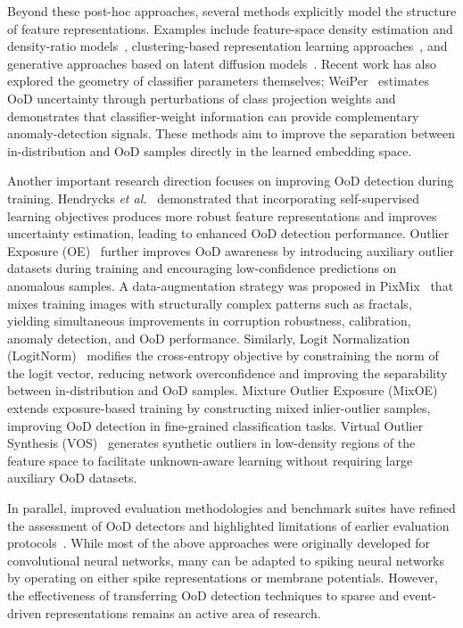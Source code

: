 \documentclass{ieeeaccess}
\begin{document}
Beyond these post-hoc approaches, several methods explicitly model the structure of feature representations. Examples include feature-space density estimation and density-ratio models~\cite{sun2022knn, zhang2022ood}, clustering-based repre\-sen\-tation learning approaches~\cite{sinhamahapatra2022all}, and generative approaches based on latent diffusion models~\cite{10.1145/3731715.3733326}. Recent work has also explored the geometry of classifier parameters themselves; WeiPer~\cite{granz2024weiper} estimates OoD uncertainty through perturbations of class projection weights and demonstrates that classifier-weight information can provide complementary anomaly-detection signals. These methods aim to improve the separation between in-distribution and OoD samples directly in the learned embedding space.

Another important research direction focuses on improving OoD detection during training. Hendrycks \textit{et al.}~\cite{NEURIPS2019} demonstrated that incorporating self-supervised learning objectives produces more robust feature representations and improves uncertainty estimation, leading to enhanced OoD detection performance. Outlier Exposure (OE)~\cite{hendrycks2018deep} further improves OoD awareness by introducing auxiliary outlier datasets during training and encouraging low-confidence predictions on anomalous samples. A data-augmentation strategy was proposed in PixMix~\cite{Hendrycks_2022_CVPR} that mixes training images with structurally complex patterns such as fractals, yielding simultaneous improvements in corruption robustness, calibration, anomaly detection, and OoD performance. Similarly, Logit Normalization (LogitNorm)~\cite{pmlr-v162-wei22d} modifies the cross-entropy objective by constraining the norm of the logit vector, reducing network overconfidence and improving the separability between in-distribution and OoD samples. Mixture Outlier Exposure (MixOE)~\cite{Zhang_2023_WACV} extends exposure-based training by constructing mixed inlier-outlier samples, improving OoD detection in fine-grained classification tasks.
Virtual Outlier Synthesis (VOS)~\cite{du2022towards} generates synthetic outliers in low-density regions of the feature space to facilitate unknown-aware learning without requiring large auxiliary OoD datasets.

In parallel, improved evaluation methodologies and benchmark suites have refined the assessment of OoD detectors and highlighted limitations of earlier evaluation protocols~\cite{kuan2022back, yang2022openood}. While most of the above approaches were originally developed for convolutional neural networks, many can be adapted to spiking neural networks by operating on either spike representations or membrane potentials. However, the effectiveness of transferring OoD detection techniques to sparse and event-driven representations remains an active area of research.
\end{document}
